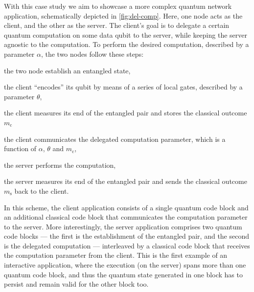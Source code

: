 With this case study we aim to showcase a more complex quantum network application, schematically
depicted in \cref{fig:del-comp}. Here, one node acts as the client, and the other as the server. The
client's goal is to delegate a certain quantum computation on some data qubit to the server, while
keeping the server agnostic to the computation. To perform the desired computation, described by a
parameter $\alpha$, the two nodes follow these steps:
%
\begin{inlinelist}
    \item the two node establish an entangled state,
    \item the client ``encodes'' its qubit by means of a series of local gates, described by a
          parameter $\theta$,
    \item the client measures its end of the entangled pair and stores the classical outcome
          $m_\text{c}$
    \item the client communicates the delegated computation parameter, which is a function of
          $\alpha$, $\theta$ and $m_\text{c}$,
    \item the server performs the computation,
    \item the server measures its end of the entangled pair and sends the classical outcome
          $m_\text{s}$ back to the client.
\end{inlinelist}
In this scheme, the client application consists of a single quantum code block and an additional
classical code block that communicates the computation parameter to the server. More interestingly,
the server application comprises two quantum code blocks --- the first is the establishment of the
entangled pair, and the second is the delegated computation --- interleaved by a classical code
block that receives the computation parameter from the client. This is the first example of an
interactive application, where the execution (on the server) spans more than one quantum code block,
and thus the quantum state generated in one block has to persist and remain valid for the other
block too.

